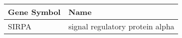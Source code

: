 \begin{tabular}{ll}
\toprule
Gene Symbol &                            Name \\
\midrule
      SIRPA & signal regulatory protein alpha \\
\bottomrule
\end{tabular}
